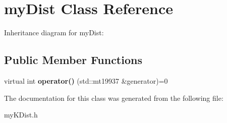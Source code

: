 \hypertarget{classmyDist}{\section{my\+Dist Class Reference}
\label{classmyDist}
}


Inheritance diagram for my\+Dist\+:
\subsection*{Public Member Functions}
\begin{DoxyCompactItemize}
\item 
\hypertarget{classmyDist_a49ccb01498a650d552a525b320b85968}{virtual int {\bfseries operator()} (std\+::mt19937 \&generator)=0}\label{classmyDist_a49ccb01498a650d552a525b320b85968}

\end{DoxyCompactItemize}


The documentation for this class was generated from the following file\+:\begin{DoxyCompactItemize}
\item 
my\+K\+Dist.\+h\end{DoxyCompactItemize}
